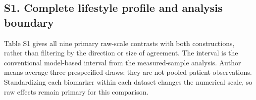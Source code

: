 \documentclass[11pt,letterpaper]{article}
\begin{document}
\setcounter{figure}{0}

\renewcommand{\thefigure}{S\arabic{figure}}

\renewcommand{\theHfigure}{S\arabic{figure}}

\setcounter{table}{0}

\renewcommand{\thetable}{S\arabic{table}}

\renewcommand{\theHtable}{S\arabic{table}}

\subsection*{S1. Complete lifestyle profile and analysis boundary}

Table S1 gives all nine primary raw-scale contrasts with both constructions, rather than filtering by the direction or size of agreement. The interval is the conventional model-based interval from the measured-sample analysis. Author means average three prespecified draws; they are not pooled patient observations. Standardizing each biomarker within each dataset changes the numerical scale, so raw effects remain primary for this comparison.


\FloatBarrier

\begingroup

\small

\renewcommand{\arraystretch}{1.22}
\end{document}
